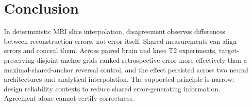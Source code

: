 \documentclass[journal,10pt]{IEEEtran}
\begin{document}
\section{Conclusion}
In deterministic MRI slice interpolation, disagreement observes differences between reconstruction errors, not error itself. Shared measurements can align errors and conceal them. Across paired brain and knee T2 experiments, target-preserving disjoint anchor grids ranked retrospective error more effectively than a maximal-shared-anchor reversal control, and the effect persisted across two neural architectures and analytical interpolation. The supported principle is narrow: design reliability contexts to reduce shared error-generating information. Agreement alone cannot certify correctness.



\end{document}
